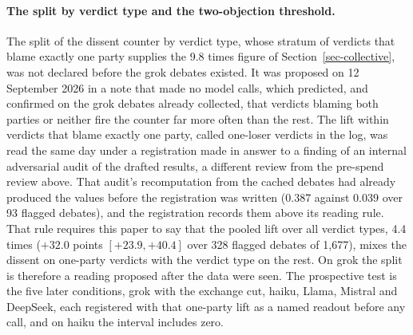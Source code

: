 \paragraph{The split by verdict type and the two-objection threshold.}
The split of the dissent counter by verdict type, whose stratum of verdicts
that blame exactly one party supplies the 9.8 times figure of
Section~\ref{sec-collective}, was not declared before the grok debates
existed. It was proposed on 12 September 2026 in a note that made no model
calls, which predicted, and confirmed on the grok debates
already collected, that verdicts blaming both parties or neither fire the
counter far more often than the rest. The lift within verdicts that blame
exactly one party, called one-loser verdicts in the log, was read the same
day under a registration made in answer to a finding of an internal
adversarial audit of the drafted results, a different review from the
pre-spend review above. That audit's recomputation from the cached debates
had already produced the values before the registration was written (0.387
against 0.039 over 93 flagged debates), and the registration records them
above its reading rule. That rule requires this paper to say that
the pooled lift over all verdict types, 4.4 times ($+32.0$ points
$[+23.9, +40.4]$ over 328 flagged debates of 1,677), mixes the dissent on
one-party verdicts with the verdict type on the rest.
On grok the split is therefore a reading proposed after the data were
seen. The prospective test is the five later conditions, grok with the exchange cut,
haiku, Llama, Mistral and DeepSeek, each registered with that one-party lift as a named readout before
any call, and on haiku the interval includes zero.
